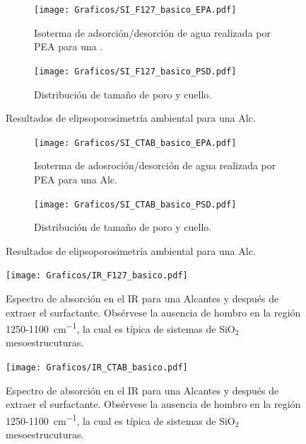 			\begin{figure}
		  	\begin{subfigure}{0.495\textwidth}
		  	\texttt{[image: Graficos/SI\_F127\_basico\_EPA.pdf]}
			\caption[Elipsoporsimetría \pdmF\space tratamiento básico.]{Isoterma de adsorción/desorción de agua realizada por PEA para una \pdmF.}
			\label{fig:F127_basico_EPA}
			\end{subfigure}
			\begin{subfigure}{0.495\textwidth}
		  	\texttt{[image: Graficos/SI\_F127\_basico\_PSD.pdf]}
			\caption{Distribución de tamaño de poro y cuello.\\ }
			\label{fig:F127_basico_PSD}
			\end{subfigure}
			\caption[Elipsoporosimetría \pdmF\space tratamiento básico.]{Resultados de elipsoporosimetría ambiental para una Alc\pdmF.}
			\end{figure}
		
			\begin{figure}
		  	\begin{subfigure}{0.495\textwidth}
		  	\texttt{[image: Graficos/SI\_CTAB\_basico\_EPA.pdf]}
			\caption[Elipsoporsimetría \pdmC\space tratamiento básico.]{Isoterma de adosroción/desorción de agua realizada por PEA para una Alc\pdmC.}
			\label{fig:CTAB_basico_EPA}
			\end{subfigure}
			\begin{subfigure}{0.495\textwidth}
		  	\texttt{[image: Graficos/SI\_CTAB\_basico\_PSD.pdf]}
			\caption{Distribución de tamaño de poro y cuello.\\ }
			\label{fig:CTAB_basico_PSD}
			\end{subfigure}
			\caption[Elipsoporosimetría \pdmC\space tratamiento básico.]{Resultados de elipsoporosimetría ambiental para una Alc\pdmC.}
			\end{figure}	
		
			\begin{figure}
			\centering
			\texttt{[image: Graficos/IR\_F127\_basico.pdf]}
			\caption[FTIR \pdmF\space tratamiento básico.]{Espectro de absorción en el IR para una Alc\pdmF\space antes y después de extraer el surfactante. Obsérvese la ausencia de hombro en la región 1250-\SI{1100}{\cm^{-1}}, la cual es típica de sistemas de SiO$_2$ mesoestrucuturas.}
			\label{fig:IR_F127_basico}
			\end{figure}


			\begin{figure}
			\centering
			\texttt{[image: Graficos/IR\_CTAB\_basico.pdf]}
			\caption[FTIR \pdmC\space tratamiento básico.]{Espectro de absorción en el IR para una Alc\pdmC\space antes y después de extraer el surfactante. Obsérvese la ausencia de hombro en la región 1250-\SI{1100}{\cm^{-1}}, la cual es típica de sistemas de SiO$_2$ mesoestrucuturas.}
			\label{fig:IR_CTAB_basico}
		    \end{figure}
		
